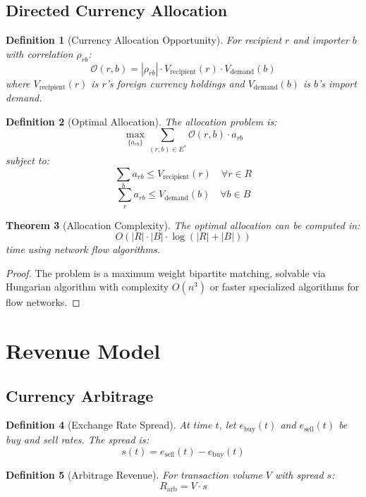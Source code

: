 \documentclass[12pt]{article}
\newtheorem{theorem}{Theorem}
\newtheorem{definition}[theorem]{Definition}
\begin{document}
\subsection{Directed Currency Allocation}

\begin{definition}[Currency Allocation Opportunity]
For recipient $r$ and importer $b$ with correlation $\rho_{rb}$:
$$
\mathcal{O}(r,b) = |\rho_{rb}| \cdot V_{\text{recipient}}(r) \cdot V_{\text{demand}}(b)
$$
where $V_{\text{recipient}}(r)$ is $r$'s foreign currency holdings and $V_{\text{demand}}(b)$ is $b$'s import demand.
\end{definition}

\begin{definition}[Optimal Allocation]
The allocation problem is:
$$
\max_{\{a_{rb}\}} \sum_{(r,b) \in E^*} \mathcal{O}(r,b) \cdot a_{rb}
$$
subject to:
$$
\sum_{b} a_{rb} \leq V_{\text{recipient}}(r) \quad \forall r \in R
$$
$$
\sum_{r} a_{rb} \leq V_{\text{demand}}(b) \quad \forall b \in B
$$
\end{definition}

\begin{theorem}[Allocation Complexity]
The optimal allocation can be computed in:
$$
O(|R| \cdot |B| \cdot \log(|R| + |B|))
$$
time using network flow algorithms.
\end{theorem}

\begin{proof}
The problem is a maximum weight bipartite matching, solvable via Hungarian algorithm with complexity $O(n^3)$ or faster specialized algorithms for flow networks.
\end{proof}

\section{Revenue Model}

\subsection{Currency Arbitrage}

\begin{definition}[Exchange Rate Spread]
At time $t$, let $e_{\text{buy}}(t)$ and $e_{\text{sell}}(t)$ be buy and sell rates. The spread is:
$$
s(t) = e_{\text{sell}}(t) - e_{\text{buy}}(t)
$$
\end{definition}

\begin{definition}[Arbitrage Revenue]
For transaction volume $V$ with spread $s$:
$$
R_{\text{arb}} = V \cdot s
$$
\end{definition}
\end{document}
